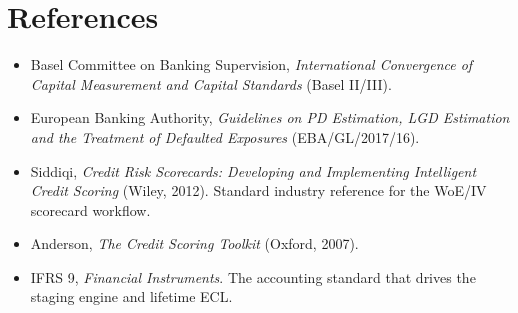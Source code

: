 \documentclass[a4paper,11pt]{article}
\begin{document}
\section{References}

\begin{itemize}
\item Basel Committee on Banking Supervision, \emph{International
Convergence of Capital Measurement and Capital Standards} (Basel II/III).
\item European Banking Authority, \emph{Guidelines on PD Estimation,
LGD Estimation and the Treatment of Defaulted Exposures} (EBA/GL/2017/16).
\item Siddiqi, \emph{Credit Risk Scorecards: Developing and Implementing
Intelligent Credit Scoring} (Wiley, 2012). Standard industry reference
for the WoE/IV scorecard workflow.
\item Anderson, \emph{The Credit Scoring Toolkit} (Oxford, 2007).
\item IFRS 9, \emph{Financial Instruments}. The accounting standard
that drives the staging engine and lifetime ECL.
\end{itemize}
\end{document}
